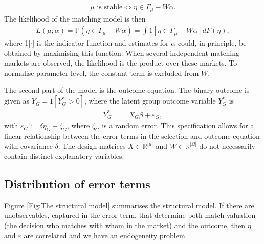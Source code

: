 \begin{eqnarray}
\mu \text{ is stable} \Leftrightarrow \eta \in \Gamma_{\mu} - W\alpha.
\end{eqnarray}
The likelihood of the matching model is then
\begin{eqnarray}
L\left(\mu; \alpha\right) = \mathbb P\left( \eta \in \Gamma_{\mu} - W\alpha \right) = \int 1\left[ \eta \in \Gamma_{\mu} - W\alpha \right] dF(\eta),
\end{eqnarray}
where 1[$\cdot$] is the indicator function and estimates for $\alpha$ could, in principle, be obtained by maximising this function. When several independent matching markets are observed, the likelihood is the product over these markets. To normalise parameter level, the constant term is excluded from $W.$

The second part of the model is the outcome equation. The binary outcome is given as $Y_G=1[Y^*_G > 0]$, where the latent group outcome variable $Y^*_G$ is
\begin{eqnarray} \label{Eqn:OutcomeEquation}
Y^*_G &=& X_G\beta + \varepsilon_G,
\end{eqnarray}
with $\varepsilon_G:=\delta\eta_G + \zeta_G$, where $\zeta_G$ is a random error. This specification allows for a linear relationship between the error terms in the selection and outcome equation with covariance $\delta$. The design matrices $X\in\mathbb R^{|\mu|}$ and $W\in\mathbb R^{|\Omega|}$ do not necessarily contain distinct explanatory variables.



\subsection{Distribution of error terms} 

Figure \ref{Fig:The structural model} summarises the structural model. If there are unobservables, captured in the error term, that determine both match valuation (the decision who matches with whom in the market) and the outcome, then $\eta$ and $\varepsilon$ are correlated and we have an endogeneity problem.

